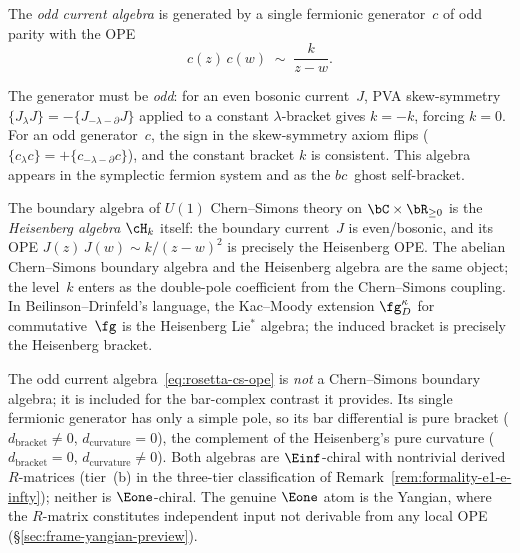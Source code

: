 \begin{definition}
\label{def:rosetta-odd-current-algebra}
The \emph{odd current algebra} is generated by a single fermionic
generator~$c$ of odd parity with the OPE
\begin{equation}\label{eq:rosetta-cs-ope}
c(z)\,c(w) \;\sim\; \frac{k}{z - w}.
\end{equation}
\end{definition}

The generator must be \emph{odd}: for an even bosonic current~$J$,
PVA skew-symmetry $\{J {}_\lambda J\} = -\{J {}_{-\lambda-\partial} J\}$
applied to a constant $\lambda$-bracket gives $k = -k$, forcing $k = 0$.
For an odd generator~$c$, the sign in the skew-symmetry axiom
flips ($\{c {}_\lambda c\} = +\{c {}_{-\lambda-\partial} c\}$),
and the constant bracket $k$ is consistent. This algebra
appears in the symplectic fermion system and as the $bc$~ghost
self-bracket.

\begin{remark}
\label{rem:abelian-cs-is-heisenberg}
The boundary algebra of $U(1)$ Chern--Simons theory on
$\bC \times \bR_{\ge 0}$ is the \emph{Heisenberg algebra}
$\cH_k$ itself: the boundary current~$J$ is even/bosonic,
and its OPE $J(z)\,J(w) \sim k/(z-w)^2$ is precisely the
Heisenberg OPE. The abelian Chern--Simons boundary algebra
and the Heisenberg algebra are the same object; the level~$k$
enters as the double-pole coefficient from the Chern--Simons
coupling. In Beilinson--Drinfeld's language, the
Kac--Moody extension $\fg_D^\kappa$ for commutative~$\fg$
is the Heisenberg Lie$^*$ algebra; the induced bracket is
precisely the Heisenberg bracket.

The odd current algebra~\eqref{eq:rosetta-cs-ope} is
\emph{not} a Chern--Simons boundary algebra; it is included
for the bar-complex contrast it provides. Its single
fermionic generator has only a simple pole, so its bar
differential is pure bracket ($d_{\mathrm{bracket}} \neq 0$,
$d_{\mathrm{curvature}} = 0$), the complement of the
Heisenberg's pure curvature ($d_{\mathrm{bracket}} = 0$,
$d_{\mathrm{curvature}} \neq 0$). Both algebras are
$\Einf$-chiral with nontrivial derived $R$-matrices
(tier~(b) in the three-tier classification of
Remark~\ref{rem:formality-e1-e-infty}); neither is
$\Eone$-chiral. The genuine $\Eone$ atom is the Yangian,
where the $R$-matrix constitutes independent input not
derivable from any local OPE
(\S\ref{sec:frame-yangian-preview}).
\end{remark}

